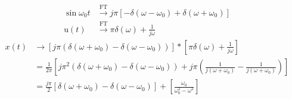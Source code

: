 \documentclass[11pt,a4paper,titlepage,fleqn]{article}
\begin{document}
    \begin{align*}
    \sin\omega_0 t &\xrightarrow{\mathrm{FT}} j\pi\left[
    -\delta(\omega-\omega_0)+\delta(\omega +\omega_0)
    \right] \\
    \mathrm u(t) &\xrightarrow{\mathrm{FT}} \pi\delta(\omega )+\frac{1}{j\omega }
    \end{align*}
    \begin{align*}
    x(t) &\to \left[
    j\pi\left(\delta(\omega +\omega_0)-\delta(\omega -\omega_0) \right)
    \right] * \left[
    \pi\delta(\omega )+\frac{1}{j\omega }
    \right] \\
    &= \frac{1}{2\pi}\left[
    j\pi^2\left(
    \delta(\omega+\omega_0)-\delta(\omega-\omega_0)
    \right) +j\pi\left(
    \frac{1}{j(\omega+\omega_0)}-\frac{1}{j(\omega+\omega_0)}
    \right)    \right]
    \\ &= \frac{j\pi}{2}\left[
    \delta(\omega +\omega_0)-\delta(\omega-\omega_0)\right]+\left[
    \frac{\omega_0}{\omega_0^2-\omega^2}
    \right] 
    \end{align*}
\end{document}
